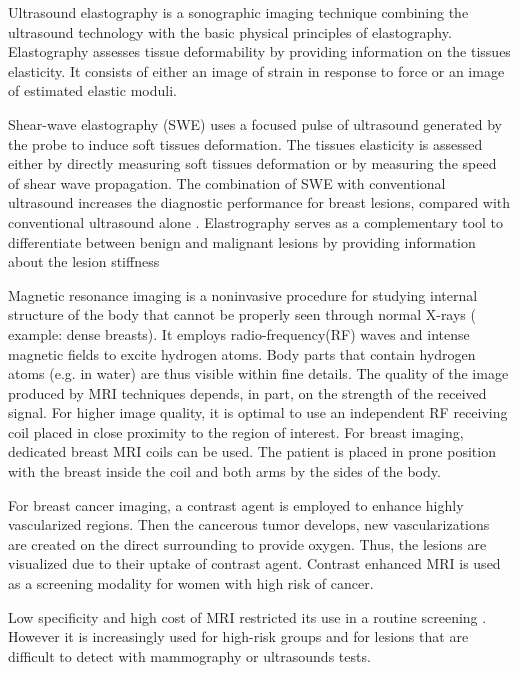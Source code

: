 Ultrasound elastography is a sonographic imaging technique combining the ultrasound technology with the basic physical principles of elastography. Elastography assesses tissue deformability by providing information on the tissues elasticity. It consists of either an image of strain in response to force or an image of estimated elastic moduli.

Shear-wave elastography (SWE) uses a focused pulse of ultrasound generated by the probe to induce soft tissues deformation. The tissues elasticity is assessed either by directly measuring soft tissues deformation or by measuring the speed of shear wave propagation. The combination of SWE with conventional ultrasound
increases the diagnostic performance for breast lesions, compared
with conventional ultrasound alone \citep{youk_shear_2017}.  Elastrography serves as a complementary tool to differentiate between benign and malignant lesions by providing information about the lesion stiffness\citep{itoh_breast_2006,olgun_use_2014}
 

Magnetic resonance imaging is a noninvasive procedure for studying internal structure of the body that cannot be properly seen through normal X-rays ( example: dense breasts).  It employs radio-frequency(RF) waves and intense magnetic fields to excite hydrogen atoms. Body parts that contain hydrogen atoms (e.g. in water) are thus visible within fine details. The quality of the image produced by MRI techniques depends, in part, on the strength of the received signal. For higher image quality, it is optimal to use an independent RF receiving coil placed in close proximity to the region of interest.  For breast imaging, dedicated breast MRI coils can be used. The patient is placed in prone position with the breast inside the coil and both arms by the sides of the body.

For breast cancer imaging,  a contrast agent is employed to enhance highly vascularized regions. Then the cancerous tumor develops, new vascularizations are created on the direct surrounding to provide oxygen. Thus, the lesions are visualized due to their uptake of contrast agent. Contrast enhanced MRI is used as a screening modality for women with high risk of cancer.  

Low specificity and high cost of MRI restricted its use in a routine screening \citep{peters_meta_2008}. However it is increasingly used for high-risk groups and for lesions that are difficult to detect with mammography or ultrasounds tests. 


